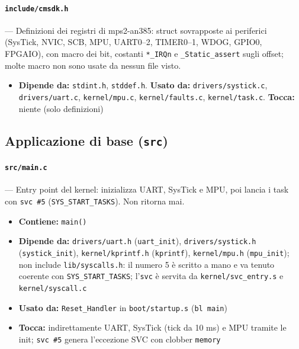 \paragraph{\texttt{include/cmsdk.h}} --- Definizioni dei registri di mps2-an385: struct sovrapposte ai periferici (SysTick, NVIC, SCB, MPU, UART0--2, TIMER0--1, WDOG, GPIO0, FPGAIO), con macro dei bit, costanti \texttt{*\_IRQn} e \texttt{\_Static\_assert} sugli offset; molte macro non sono usate da nessun file visto.
\begin{itemize}
  \item \textbf{Dipende da:} \texttt{stdint.h}, \texttt{stddef.h}. \textbf{Usato da:} \texttt{drivers/systick.c}, \texttt{drivers/uart.c}, \texttt{kernel/mpu.c}, \texttt{kernel/faults.c}, \texttt{kernel/task.c}. \textbf{Tocca:} niente (solo definizioni)
\end{itemize}

\subsection{Applicazione di base (\texttt{src})}

\paragraph{\texttt{src/main.c}} --- Entry point del kernel: inizializza UART, SysTick e MPU, poi lancia i task con \texttt{svc \#5} (\texttt{SYS\_START\_TASKS}). Non ritorna mai.
\begin{itemize}
  \item \textbf{Contiene:} \texttt{main()}
  \item \textbf{Dipende da:} \texttt{drivers/uart.h} (\texttt{uart\_init}), \texttt{drivers/systick.h} (\texttt{systick\_init}), \texttt{kernel/kprintf.h} (\texttt{kprintf}), \texttt{kernel/mpu.h} (\texttt{mpu\_init}); non include \texttt{lib/syscalls.h}: il numero 5 è scritto a mano e va tenuto coerente con \texttt{SYS\_START\_TASKS}; l'\texttt{svc} è servita da \texttt{kernel/svc\_entry.s} e \texttt{kernel/syscall.c}
  \item \textbf{Usato da:} \texttt{Reset\_Handler} in \texttt{boot/startup.s} (\texttt{bl main})
  \item \textbf{Tocca:} indirettamente UART, SysTick (tick da 10 ms) e MPU tramite le init; \texttt{svc \#5} genera l'eccezione SVC con clobber \texttt{memory}
\end{itemize}


